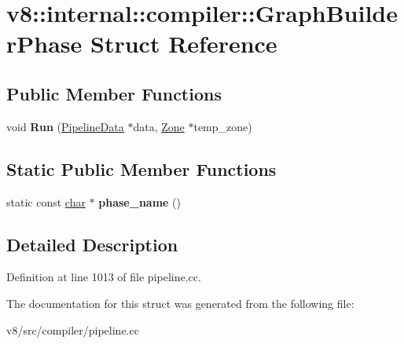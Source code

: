 \hypertarget{structv8_1_1internal_1_1compiler_1_1GraphBuilderPhase}{}\section{v8\+:\+:internal\+:\+:compiler\+:\+:Graph\+Builder\+Phase Struct Reference}
\label{structv8_1_1internal_1_1compiler_1_1GraphBuilderPhase}
\subsection*{Public Member Functions}
\begin{DoxyCompactItemize}
\item 
\mbox{\label{structv8_1_1internal_1_1compiler_1_1GraphBuilderPhase_a38e1eecf4d86d54a109c5743f0f7dc38}} 
void {\bfseries Run} (\mbox{\hyperlink{classv8_1_1internal_1_1compiler_1_1PipelineData}{Pipeline\+Data}} $\ast$data, \mbox{\hyperlink{classv8_1_1internal_1_1Zone}{Zone}} $\ast$temp\+\_\+zone)
\end{DoxyCompactItemize}
\subsection*{Static Public Member Functions}
\begin{DoxyCompactItemize}
\item 
\mbox{\label{structv8_1_1internal_1_1compiler_1_1GraphBuilderPhase_a6bb54c1550b475f16d9dceeab96f6bee}} 
static const \mbox{\hyperlink{classchar}{char}} $\ast$ {\bfseries phase\+\_\+name} ()
\end{DoxyCompactItemize}


\subsection{Detailed Description}


Definition at line 1013 of file pipeline.\+cc.



The documentation for this struct was generated from the following file\+:\begin{DoxyCompactItemize}
\item 
v8/src/compiler/pipeline.\+cc\end{DoxyCompactItemize}
